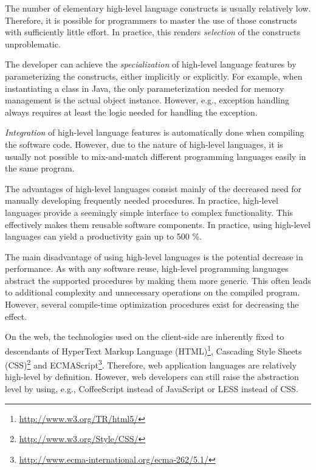 The number of elementary high-level language constructs is usually relatively low. Therefore, it is possible for programmers to master the use of those constructs with sufficiently little effort. In practice, this renders \emph{selection} of the constructs unproblematic. \citep[chap.~3]{krueger_software_1992}

The developer can achieve the \emph{specialization} of high-level language features by parameterizing the constructs, either implicitly or explicitly. For example, when instantiating a class in Java, the only parameterization needed for memory management is the actual object instance. However, e.g., exception handling always requires at least the logic needed for handling the exception. \citep[chap.~3]{krueger_software_1992}

\emph{Integration} of high-level language features is automatically done when compiling the software code. However, due to the nature of high-level languages, it is usually not possible to mix-and-match different programming languages easily in the same program. \citep[chap.~3]{krueger_software_1992} %

The advantages of high-level languages consist mainly of the decreased need for manually developing frequently needed procedures. In practice, high-level languages provide a seemingly simple interface to complex functionality. This effectively makes them reusable software components. In practice, using high-level languages can yield a productivity gain up to 500 \%. \citep[chap.~3]{krueger_software_1992}

The main disadvantage of using high-level languages is the potential decrease in performance. As with any software reuse, high-level programming languages abstract the supported procedures by making them more generic. This often leads to additional complexity and unnecessary operations on the compiled program. However, several compile-time optimization procedures exist for decreasing the effect. \citep{carro_high-level_2006}

On the web, the technologies used on the client-side are inherently fixed to descendants of HyperText Markup Language (HTML)\footnote{\url{http://www.w3.org/TR/html5/}}, Cascading Style Sheets (CSS)\footnote{\url{http://www.w3.org/Style/CSS/}} and ECMAScript\footnote{\url{http://www.ecma-international.org/ecma-262/5.1/}}. Therefore, web application languages are relatively high-level by definition. However, web developers can still raise the abstraction level by using, e.g., CoffeeScript \citep{ashkenas_coffeescript_2009} instead of JavaScript or LESS \citep{sellier_less_2009} instead of CSS.

